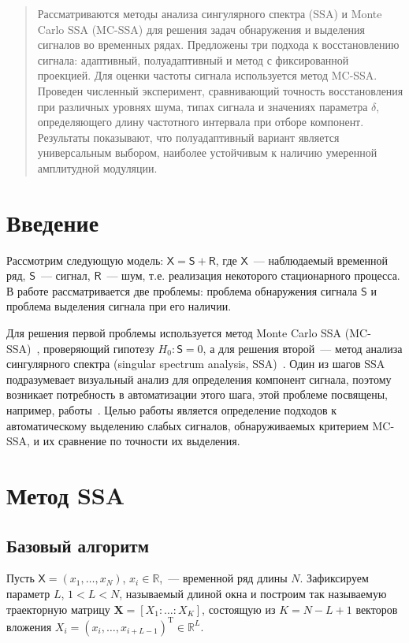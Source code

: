 \documentclass{math-mech-sci}
\begin{document}
\maketitle

\begin{abstract}
   Рассматриваются методы анализа сингулярного спектра (SSA) и Monte Carlo SSA (MC-SSA) для решения задач обнаружения и выделения сигналов во временных рядах. Предложены три подхода к восстановлению сигнала: адаптивный, полуадаптивный и метод с фиксированной проекцией. Для оценки частоты сигнала используется метод MC-SSA. Проведен численный эксперимент, сравнивающий точность восстановления при различных уровнях шума, типах сигнала и значениях параметра $\delta$, определяющего длину частотного интервала при отборе компонент. Результаты показывают, что полуадаптивный вариант является универсальным выбором, наиболее устойчивым к наличию умеренной амплитудной  модуляции.
\end{abstract}

\section*{Введение}
Рассмотрим следующую модель: $\mathsf{X}=\mathsf{S}+\mathsf{R}$, где $\mathsf{X}$~--- наблюдаемый временной ряд, $\mathsf{S}$~--- сигнал, $\mathsf{R}$~--- шум, т.е. реализация некоторого стационарного процесса. В работе рассматривается две проблемы: проблема обнаружения сигнала $\mathsf{S}$ и проблема выделения сигнала при его наличии.

Для решения первой проблемы используется метод Monte Carlo SSA (MC-SSA)~\cite{AllenSmith96}, проверяющий гипотезу $H_0:\mathsf{S}=0$, а для решения второй~--- метод анализа сингулярного спектра (singular spectrum analysis, SSA)~\cite{Broomhead1986, ssa2001}. Один из шагов SSA подразумевает визуальный анализ для определения компонент сигнала, поэтому возникает потребность в автоматизации этого шага, этой проблеме посвящены, например, работы~\cite{alexandrov,Kalantari2019, circSSA, autoSSA}. Целью работы является определение подходов к автоматическому выделению слабых сигналов, обнаруживаемых критерием MC-SSA, и их сравнение по точности их выделения.

\section*{Метод SSA}
\subsection*{Базовый алгоритм}
Пусть $\mathsf{X}=(x_1,\ldots,x_N)$, $x_i\in \mathbb{R}$,~--- временной ряд длины $N$. Зафиксируем параметр $L$, $1<L<N$, называемый длиной окна и построим так называемую траекторную матрицу $\mathbf{X}=[X_1:\ldots:X_K]$, состоящую из $K=N-L+1$ векторов вложения $X_i=(x_i,\ldots,x_{i+L-1})^{\mathrm{T}}\in \mathbb R^L$.
\end{document}

